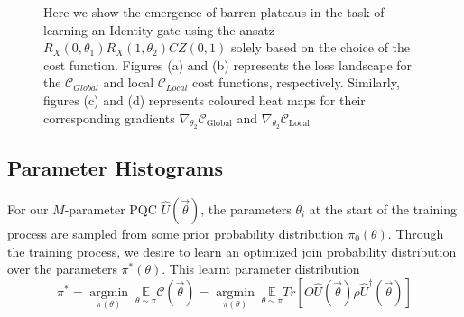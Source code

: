 \begin{figure}[t]
\begin{subfigure}[b]{0.48\textwidth}
\begin{minipage}{0.9\textwidth}
    \end{minipage}
    \end{subfigure}
    \caption[Presence of barren plateaus in parameterized quantum circuits]{Here we show the emergence of barren plateaus in the task of learning an Identity gate using the ansatz $R_X(0,\theta_1)R_X(1, \theta_2)CZ(0, 1)$ solely based on the choice of the cost function. Figures (a) and (b) represents the loss landscape for the $\mathcal{C}_{Global}$ and local $\mathcal{C}_{Local}$ cost functions, respectively. Similarly, figures (c) and (d) represents coloured heat maps for their  corresponding gradients $\nabla_{\theta_2}\mathcal{C}_{\text{Global}}$ and $\nabla_{\theta_2}\mathcal{C}_{\text{Local}}$} 
    \label{fig:barren-plateau}
\end{figure}



\subsection{Parameter Histograms}

For our $M$-parameter PQC $\hat{U}(\vec{\theta})$, the parameters $\theta_i$ at the start of the training process are sampled from some prior probability distribution $\pi_0(\theta)$. Through the training process, we desire to learn an optimized join probability distribution over the parameters $\pi^*(\theta)$. This learnt parameter distribution
\begin{equation}
    \pi^* = \underset{\pi(\theta)}{\operatorname{argmin}} \; \underset{\theta \sim \pi}{\mathbb{E}} \mathcal{C}(\vec{\theta}) = \underset{\pi(\theta)}{\operatorname{argmin}} \; \underset{\theta \sim \pi}{\mathbb{E}} Tr[O \hat{U}(\vec{\theta}) \rho \hat{U}^\dagger(\vec{\theta})]
\end{equation}

